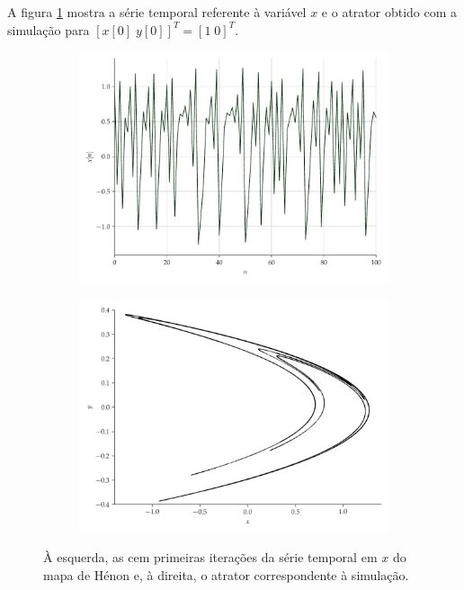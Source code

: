 \documentclass[a4paper, 12pt]{article}
\begin{document}
A figura \ref{fig:henon} mostra a série temporal referente à variável $x$ e o atrator obtido com a simulação para $[x[0]\; y[0]]^T = [1\; 0]^T$.
\begin{figure}[H]
     \begin{subfigure}[t]{0.35\textwidth}
         \includegraphics[scale=0.35]{serie-henon-x.pdf}
     \end{subfigure}
     \centering
     \begin{subfigure}[t]{0.35\textwidth}
         \includegraphics[scale=0.35]{mapa-de-henon.png}
     \end{subfigure}
     \caption{À esquerda, as cem primeiras iterações da série temporal em $x$ do mapa de Hénon e, à direita, o atrator correspondente à simulação.}
     \label{fig:henon}
\end{figure}
\end{document}
